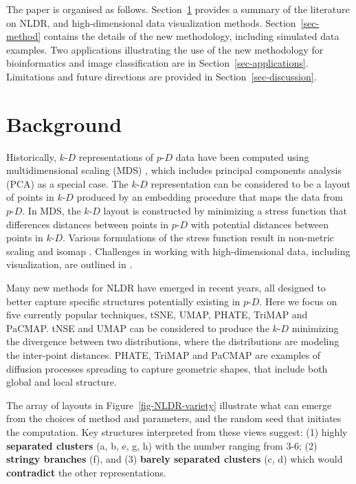 \documentclass[
  12pt]{article}
\newcommand\pD{$p\text{-}D$}
\newcommand\kD{$k\text{-}D$}
\begin{document}
The paper is organised as follows. Section~\ref{sec-background} provides
a summary of the literature on NLDR, and high-dimensional data
visualization methods. Section~\ref{sec-method} contains the details of
the new methodology, including simulated data examples. Two applications
illustrating the use of the new methodology for bioinformatics and image
classification are in Section~\ref{sec-applications}. Limitations and
future directions are provided in Section~\ref{sec-discussion}.

\section{Background}\label{sec-background}

Historically, \kD{} representations of \pD{} data have been computed
using multidimensional scaling (MDS) \citep{borg2005}, which includes
principal components analysis (PCA) \citep{jolliffe2011} as a special
case. The \kD{} representation can be considered to be a layout of
points in \kD{} produced by an embedding procedure that maps the data
from \pD{}. In MDS, the \kD{} layout is constructed by minimizing a
stress function that differences distances between points in \pD{} with
potential distances between points in \kD{}. Various formulations of the
stress function result in non-metric scaling \citep{saeed2018} and
isomap \citep{silva2002}. Challenges in working with high-dimensional
data, including visualization, are outlined in \citet{johnstone2009}.

Many new methods for NLDR have emerged in recent years, all designed to
better capture specific structures potentially existing in \pD{}. Here
we focus on five currently popular techniques, tSNE, UMAP, PHATE, TriMAP
and PaCMAP. tNSE and UMAP can be considered to produce the \kD{}
minimizing the divergence between two distributions, where the
distributions are modeling the inter-point distances. PHATE, TriMAP and
PaCMAP are examples of diffusion processes \citep{coifman2005} spreading
to capture geometric shapes, that include both global and local
structure.

The array of layouts in Figure~\ref{fig-NLDR-variety} illustrate what
can emerge from the choices of method and parameters, and the random
seed that initiates the computation. Key structures interpreted from
these views suggest: (1) highly \textbf{separated clusters} (a, b, e, g,
h) with the number ranging from 3-6; (2) \textbf{stringy branches} (f),
and (3) \textbf{barely separated clusters} (c, d) which would
\textbf{contradict} the other representations.
\end{document}
